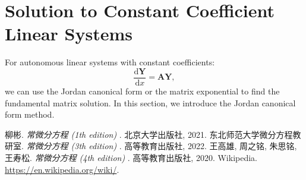 \documentclass[11pt]{../../TexTemplate/elegantbook}
\begin{document}
\section{Solution to Constant Coefficient Linear Systems}
For autonomous linear systems with constant coefficients:
\begin{equation}\label{eq:constant coefficient linear system}
    \frac{\mathrm{d}\mathbf{Y}}{\mathrm{d}x} = \mathbf{A} \mathbf{Y},
\end{equation}
we can use the Jordan canonical form or the matrix exponential to find the fundamental matrix solution.
In this section, we introduce the Jordan canonical form method.




\begin{thebibliography}{99} 
 柳彬. \emph{常微分方程 (1th edition) }. 北京大学出版社, 2021.
 东北师范大学微分方程教研室. \emph{常微分方程 (3th edition) }. 高等教育出版社, 2022.
 王高雄, 周之铭, 朱思铭, 王寿松. \emph{常微分方程 (4th edition) }. 高等教育出版社, 2020.
 Wikipedia. \url{https://en.wikipedia.org/wiki/}.

\end{thebibliography}
\end{document}
